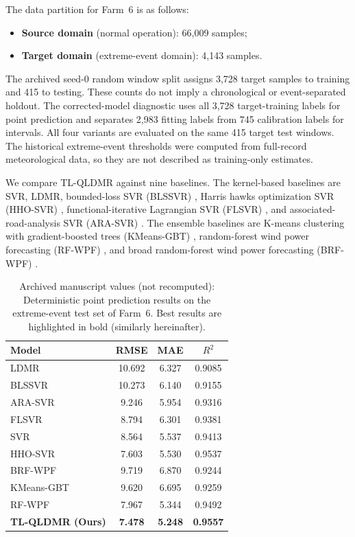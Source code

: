 The data partition for Farm~6 is as follows:
\begin{itemize}
    \item \textbf{Source domain} (normal operation): 66{,}009 samples;
    \item \textbf{Target domain} (extreme-event domain): 4{,}143 samples.
\end{itemize}

{\color{blue}The archived seed-0 random window split assigns 3,728 target samples to training and 415 to testing. These counts do not imply a chronological or event-separated holdout. The corrected-model diagnostic uses all 3,728 target-training labels for point prediction and separates 2,983 fitting labels from 745 calibration labels for intervals. All four variants are evaluated on the same 415 target test windows. The historical extreme-event thresholds were computed from full-record meteorological data, so they are not described as training-only estimates.}

We compare TL-QLDMR against nine baselines. The kernel-based baselines are SVR, LDMR, bounded-loss SVR (BLSSVR) \citep{fu2023bounded}, Harris hawks optimization SVR (HHO-SVR) \citep{houssein2025hho}, functional-iterative Lagrangian SVR (FLSVR) \citep{meena2025flsvr}, and associated-road-analysis SVR (ARA-SVR) \citep{duan2025ara}. The ensemble baselines are K-means clustering with gradient-boosted trees (KMeans-GBT) \citep{rizkallah2025kmeans}, random-forest wind power forecasting (RF-WPF) \citep{mustaffa2025rf}, and broad random-forest wind power forecasting (BRF-WPF) \citep{chen2025brf}.

\begin{table}[ht]
\centering
\caption{{\color{blue}Archived manuscript values (not recomputed): }Deterministic point prediction results on the extreme-event test set of Farm~6. Best results are highlighted in bold (similarly hereinafter).}
\setlength{\tabcolsep}{3.5mm}
\begin{tabular}{lccc}
\toprule
Model & RMSE & MAE & $R^2$ \\
\midrule
LDMR & 10.692 & 6.327 & 0.9085 \\
BLSSVR        & 10.273 & 6.140 & 0.9155 \\
ARA-SVR       & 9.246 & 5.954 & 0.9316 \\
FLSVR         & 8.794 & 6.301 & 0.9381 \\
SVR  & 8.564 & 5.537 & 0.9413 \\
HHO-SVR       & 7.603 & 5.530 & 0.9537 \\
BRF-WPF       & 9.719 & 6.870 & 0.9244 \\
KMeans-GBT    & 9.620 & 6.695 & 0.9259 \\
RF-WPF        & 7.967 & 5.344 & 0.9492 \\
\textbf{TL-QLDMR (Ours)} & \textbf{7.478} & \textbf{5.248} & \textbf{0.9557} \\
\bottomrule
\end{tabular}
\label{tab:exp2_results}
\end{table}

